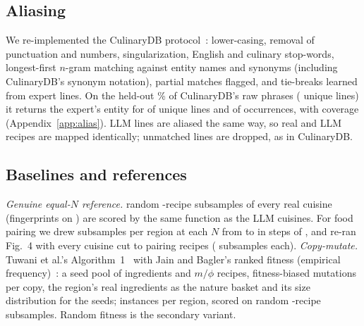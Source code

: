 \documentclass[conference]{IEEEtran}
\begin{document}
\subsection{Aliasing}
We re-implemented the CulinaryDB protocol~\cite{singh2018}: lower-casing, removal of punctuation and numbers, singularization, English and culinary stop-words, longest-first $n$-gram matching against entity names and synonyms (including CulinaryDB's synonym notation), partial matches flagged, and tie-breaks learned from expert lines. On the held-out \NAliasTestShare\% of CulinaryDB's raw phrases (\NAliasTestLines{} unique lines) it returns the expert's entity for \NAliasAccLinesPct{} of unique lines and \NAliasAccRowsPct{} of occurrences, with \NAliasCoveragePct{} coverage (Appendix~\ref{app:alias}). LLM lines are aliased the same way, so real and LLM recipes are mapped identically; unmatched lines are dropped, as in CulinaryDB.

\subsection{Baselines and references}
\emph{Genuine equal-$N$ reference.} \NRefSubsamples{} random \NLLMN-recipe subsamples of every real cuisine (fingerprints on \NRefFpSubsamples) are scored by the same function as the LLM cuisines. For food pairing we drew \NEqReps{} subsamples per region at each $N$ from \NEqGridMin{} to \NEqGridMax{} in steps of \NEqGridStep, and re-ran Fig.~4 with every cuisine cut to \NMatchedN{} pairing recipes (\NMatchedReps{} subsamples each).
\emph{Copy-mutate.} Tuwani et al.'s Algorithm~1~\cite{tuwani2019} with Jain and Bagler's ranked fitness (empirical frequency)~\cite{jain2018}: a seed pool of \NCMSeedPool{} ingredients and $m/\phi$ recipes, \NCMMutations{} fitness-biased mutations per copy, the region's real ingredients as the nature basket and its size distribution for the seeds; \NCMInstances{} instances per region, scored on random \NLLMN-recipe subsamples. Random fitness is the secondary variant.
\end{document}
